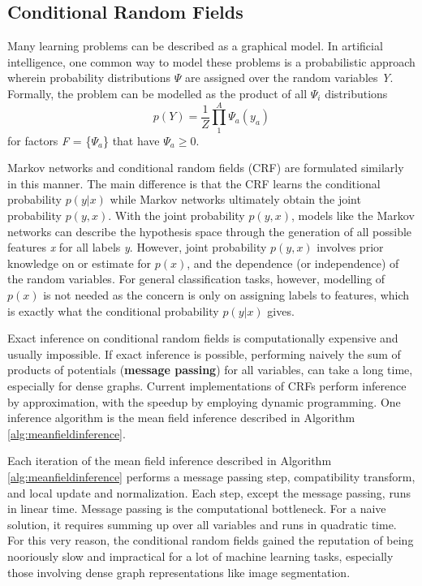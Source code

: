 \documentclass[journal]{IEEEtran}
\begin{document}
\subsection{Conditional Random Fields}
Many learning problems can be described as a graphical model. In artificial intelligence, one common way to model these problems is a probabilistic approach wherein probability distributions \textit{$\Psi$} are assigned over the random variables \textit{Y}. Formally, the problem can be modelled as the product of all \textit{$\Psi_i$} distributions
\begin{equation}
p(Y) = \frac{1}{Z}\prod_1^A \Psi_a(y_a)
\end{equation}
for factors \textit{F} = \{$\Psi_a$\} that have $\Psi_a \geq 0$. 
 
Markov networks and conditional random fields (CRF) are formulated similarly in this manner. The main difference is that the CRF learns the conditional probability $p(y|x)$ while Markov networks ultimately obtain the joint probability $p(y,x)$. With the joint probability $p(y,x)$, models like the Markov networks can describe the hypothesis space through the generation of all possible features \textit{x} for all labels \textit{y}. However, joint probability $p(y,x)$ involves prior knowledge on or estimate for $p(x)$, and the dependence (or independence) of the random variables. For general classification tasks, however, modelling of $p(x)$ is not needed as the concern is only on assigning labels to features, which is exactly what the conditional probability $p(y|x)$ gives.

Exact inference on conditional random fields is computationally expensive and usually impossible. If exact inference is possible, performing naively the sum of products of potentials (\textbf{message passing}) for all variables, can take a long time, especially for dense graphs. Current implementations of CRFs perform inference by approximation, with the speedup by employing dynamic programming. One inference algorithm is the mean field inference described in Algorithm \ref{alg:meanfieldinference}.

Each iteration of the mean field inference described in Algorithm \ref{alg:meanfieldinference} performs a message passing step, compatibility transform, and local update and normalization. Each step, except the message passing, runs in linear time. Message passing is the computational bottleneck. For a naive solution, it requires summing up over all variables and runs in quadratic time. For this very reason, the conditional random fields gained the reputation of being nooriously slow and impractical for a lot of machine learning tasks, especially those involving dense graph representations like image segmentation.
\end{document}
